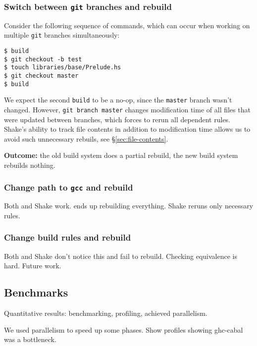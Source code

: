 \subsubsection{Switch between \texttt{git} branches and rebuild}

Consider the following sequence of commands, which can occur when working on
multiple \texttt{git} branches simultaneously:

\begin{lstlisting}
$ build
$ git checkout -b test
$ touch libraries/base/Prelude.hs
$ git checkout master
$ build
\end{lstlisting}

We expect the second \texttt{build} to be a no-op, since the \texttt{master}
branch wasn't changed. However, \texttt{git branch master} changes modification
time of all files that were updated between branches, which forces \make{} to
rerun all dependent rules. Shake's ability to track file contents in addition to
modification time allows us to avoid such unnecessary rebuils, see
\S\ref{sec:file-contents}.

\textbf{Outcome:} the old build system does a partial rebuild, the new build
system rebuilds nothing.

\subsubsection{Change path to \texttt{gcc} and rebuild}

Both \make{} and Shake work. \make{} ends up rebuilding everything. Shake reruns
only necessary rules.

\subsubsection{Change build rules and rebuild}

Both \make{} and Shake don't notice this and fail to rebuild. Checking
equivalence is hard. Future work.

\subsection{Benchmarks}


Quantitative results: benchmarking, profiling, achieved parallelism.

We used parallelism to speed up some phases. Show profiles showing ghc-cabal was
a bottleneck.

